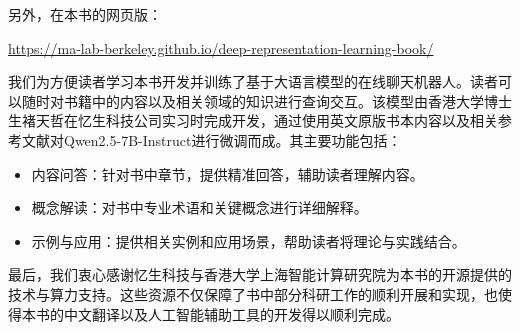 \documentclass[../../book-main_zh.tex]{subfiles}
\begin{document}
另外，在本书的网页版：
\begin{center}
    \url{https://ma-lab-berkeley.github.io/deep-representation-learning-book/}
\end{center}
我们为方便读者学习本书开发并训练了基于大语言模型的在线聊天机器人。读者可以随时对书籍中的内容以及相关领域的知识进行查询交互。该模型由香港大学博士生褚天哲在忆生科技公司实习时完成开发，通过使用英文原版书本内容以及相关参考文献对Qwen2.5-7B-Instruct进行微调而成。其主要功能包括：
\begin{itemize}
    \item 内容问答：针对书中章节，提供精准回答，辅助读者理解内容。

    \item 概念解读：对书中专业术语和关键概念进行详细解释。

    \item 示例与应用：提供相关实例和应用场景，帮助读者将理论与实践结合。
\end{itemize}

最后，我们衷心感谢忆生科技与香港大学上海智能计算研究院为本书的开源提供的技术与算力支持。这些资源不仅保障了书中部分科研工作的顺利开展和实现，也使得本书的中文翻译以及人工智能辅助工具的开发得以顺利完成。%
\end{document}
